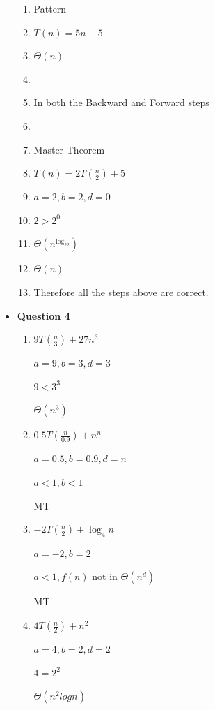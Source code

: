 \documentclass{article}
\begin{document}
\begin{itemize}
\begin{enumerate}
        \item[] Pattern
        \item[] $T(n) = 5n - 5$
        \item[] $\Theta (n)$
        \item[]
        \item[] In both the Backward and Forward steps
        \item[]
        \item[] Master Theorem
        \item[] $T(n) = 2T(\frac{n}{2}) + 5$
        \item[] $a = 2, b = 2, d = 0$
        \item[] $2 > 2^0$
        \item[] $\Theta (n^{\log_22})$
        \item[] $\Theta (n)$
        \item[] Therefore all the steps above are correct.

    \end{enumerate}

    \item\textbf{ Question 4}

    \begin{enumerate}
        \item $9T(\frac{n}{3}) + 27n^3$

            $a = 9, b = 3, d = 3$

            $9 < 3^3$

            $\Theta (n^3)$

        \item $0.5T(\frac{n}{0.9}) + n^n$

            $a = 0.5, b = 0.9, d = n$

            $a < 1, b < 1$

            MT

        \item $-2T(\frac{n}{2}) + \log_4n$

            $a = -2, b = 2$

            $a < 1, f(n)$ not in $\Theta ( n^d )$

            MT

        \item $4T(\frac{n}{2}) + n^2$

            $a = 4, b = 2, d = 2$

            $4 = 2^2$

            $\Theta (n^2logn)$

    \end{enumerate}


\end{itemize}
\end{document}
